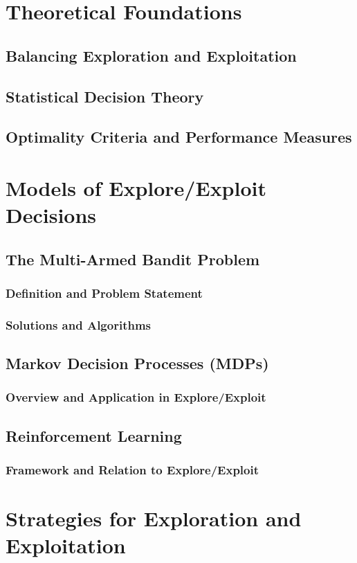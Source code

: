 \documentclass[12pt]{book} %
\begin{document}
\section{Theoretical Foundations}
\subsection{Balancing Exploration and Exploitation}
\subsection{Statistical Decision Theory}
\subsection{Optimality Criteria and Performance Measures}

\section{Models of Explore/Exploit Decisions}
\subsection{The Multi-Armed Bandit Problem}
\subsubsection{Definition and Problem Statement}
\subsubsection{Solutions and Algorithms}
\subsection{Markov Decision Processes (MDPs)}
\subsubsection{Overview and Application in Explore/Exploit}
\subsection{Reinforcement Learning}
\subsubsection{Framework and Relation to Explore/Exploit}

\section{Strategies for Exploration and Exploitation}
\end{document}
